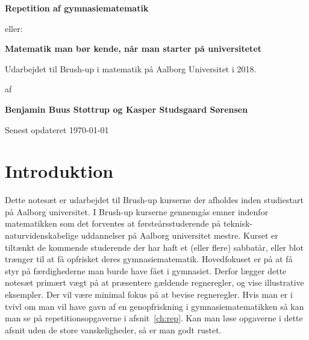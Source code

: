 



\author{Kasper Studsgaard Sørensen, Benjamin Buus Støttrup}

\pagestyle{plain}
\begin{titlepage}
    \begin{center}
        \vspace*{1cm}
        \Huge
        \textbf{Repetition af gymnasiematematik}
 
        \vspace{0.5cm}
        \Large
         eller:
         \vspace{0.5cm}

        
        \Huge
        \textbf{Matematik man bør kende, når man starter på universitetet}
        
        \vspace{0.5cm}
        \large
        Udarbejdet til Brush-up i matematik på Aalborg Universitet i 2018.
        \vspace{1.5cm}

        af 

        \vspace{1.5cm}
        \textbf{Benjamin Buus Støttrup og Kasper Studsgaard Sørensen}

        \vfill
        Senest opdateret \today
        \vspace{2cm}
 
      
        
        
    \end{center}
    \doclicenseThis
 \end{titlepage}



\tableofcontents
\chapter*{Introduktion}\normalsize
Dette notesæt er udarbejdet til Brush-up kurserne der afholdes inden studiestart på Aalborg universitet. I Brush-up kurserne gennemgås emner indenfor matematikken som det forventes at førsteårsstuderende på teknisk-naturvidenskabelige uddannelser på Aalborg universitet mestre. Kurset er tiltænkt de kommende studerende der har haft et (eller flere) sabbatår, eller blot trænger til at få opfrisket deres gymnasiematematik. Hovedfokuset er på at få styr på færdighederne man burde have fået i gymnasiet. Derfor lægger dette notesæt primært vægt på at præsentere gældende regneregler, og vise illustrative eksempler. Der vil være minimal fokus på at bevise regneregler. Hvis man er i tvivl om man vil have gavn af en genopfriskning i gymnasiematematikken så kan man se på repetitionsopgaverne i afsnit~\ref{ch:rep}. Kan man løse opgaverne i dette afsnit uden de store vanskeligheder, så er man godt rustet.

